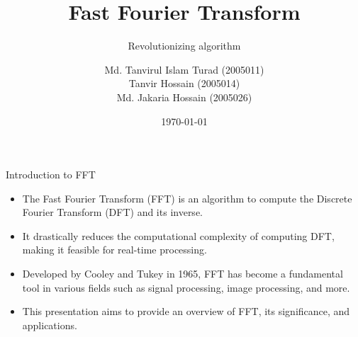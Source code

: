 \documentclass{beamer}
\title{Fast Fourier Transform}
\subtitle{Revolutionizing algorithm}
\author[Turad \and Tanvir \and Jakaria]
{Md. Tanvirul Islam Turad (2005011)\\
Tanvir Hossain (2005014)\\
Md. Jakaria Hossain (2005026)\\}
\institute[CSE, BUET]
{
	Department of CSE\\
	Bangladesh University of Engineering and Technology
}
\date{\today}
\begin{document}
	
	\frame{\titlepage}
	
	
	

\begin{frame}{Introduction to FFT}
  \begin{itemize}
    \item The Fast Fourier Transform (FFT) is an algorithm to compute the Discrete Fourier Transform (DFT) and its inverse.
    \item It drastically reduces the computational complexity of computing DFT, making it feasible for real-time processing.
    \item Developed by Cooley and Tukey in 1965, FFT has become a fundamental tool in various fields such as signal processing, image processing, and more.
    \item This presentation aims to provide an overview of FFT, its significance, and applications.
  \end{itemize}
\end{frame}
\end{document}
